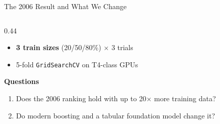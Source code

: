 \documentclass[aspectratio=169,11pt]{beamer}
\newcommand{\hl}[1]{\textbf{\color{modern}#1}}
\begin{document}
\begin{frame}{The 2006 Result and What We Change}
\begin{columns}[T]
\begin{column}{0.44\textwidth}
\begin{itemize}
  \item \hl{3 train sizes} (20/50/80\%) $\times$ 3 trials
  \item 5-fold \texttt{GridSearchCV} on T4-class GPUs
\end{itemize}
\medskip
\textbf{Questions}
\begin{enumerate}\scriptsize
  \item Does the 2006 ranking hold with up to 20$\times$ more training data?
  \item Do modern boosting and a tabular foundation model change it?
\end{enumerate}
\end{column}
\end{columns}
\end{frame}

\end{document}
